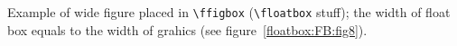 \documentclass{book}
\providecommand*{\com}[1]{\texttt{\char`\\#1}}
\begin{document}
\Text

Example of wide figure placed in \verb|\ffigbox| (\verb|\floatbox| stuff);
the width of float box equals  to the width of grahics
(see figure~\ref{floatbox:FB:fig8}).
\begin{figure*}
  {\caption{%
Wide figure (\protect\com{ffigbox})
width of graphics}\label{floatbox:FB:fig8}}
\end{figure*}%
\Text
\end{document}
